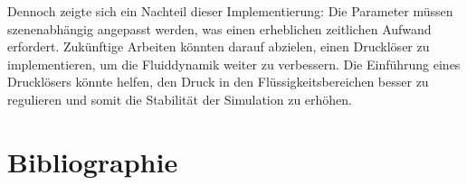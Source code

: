 \documentclass[a4paper, 12pt]{article}
\begin{document}
Dennoch zeigte sich ein Nachteil dieser Implementierung: Die Parameter müssen szenenabhängig angepasst werden, was einen erheblichen zeitlichen Aufwand erfordert. Zukünftige Arbeiten könnten darauf abzielen, einen Drucklöser zu implementieren, um die Fluiddynamik weiter zu verbessern. Die Einführung eines Drucklösers könnte helfen, den Druck in den Flüssigkeitsbereichen besser zu regulieren und somit die Stabilität der Simulation zu erhöhen.

\section{Bibliographie}
\end{document}
